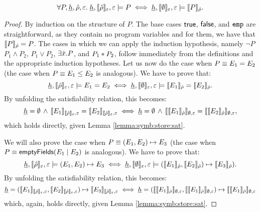
\begin{lemma}\label{lemma:symb:store:sat}
$$
\forall P, \underline{h}, \hat\rho, \varepsilon. \;
\underline{h}, \llbracket \hat\rho \rrbracket_{\varepsilon}, \varepsilon \models P
\iff 
\underline{h}, \llbracket \emptyset \rrbracket_{\varepsilon}, \varepsilon \models \llbracket P \rrbracket_{\hat\rho}.
$$
\end{lemma}
\begin{proof}
By induction on the structure of $P$. The base cases ${\sf true}$, ${\sf false}$, and $\texttt{emp}$ are straightforward, as they contain no program variables and for them, we have that $\llbracket P \rrbracket_{\hat\rho} = P$. The cases in which we can apply the induction hypothesis, namely $\neg P$ $P_1 \wedge P_2$, $P_1 \vee P_2$, $\exists \hat{x}. P$, and $P_1 \mathbin{*} P_2$, follow immediately from the definitions and the appropriate induction hypotheses. Let us now do the case when $P \equiv E_1 = E_2$ (the case when $P \equiv E_1 \leq E_2$ is analogous). We have to prove that:
$$
\underline{h}, \llbracket \hat\rho \rrbracket_{\varepsilon}, \varepsilon \models E_1 = E_2
\iff 
\underline{h}, \llbracket \emptyset \rrbracket_{\varepsilon}, \varepsilon \models \llbracket E_1 \rrbracket_{\hat\rho} = \llbracket E_2 \rrbracket_{\hat\rho}.
$$
By unfolding the satisfiability relation, this becomes:
$$
\underline{h} = \emptyset \, \wedge \, \llbracket E_1 \rrbracket_{\llbracket \hat\rho \rrbracket_{\varepsilon}, \varepsilon} = \llbracket E_2 \rrbracket_{\llbracket \hat\rho \rrbracket_{\varepsilon}, \varepsilon}
\iff 
\underline{h} = \emptyset \, \wedge \, \llbracket \llbracket E_1 \rrbracket_{\hat\rho} \rrbracket_{\emptyset, \varepsilon} = \llbracket \llbracket E_2 \rrbracket_{\hat\rho} \rrbracket_{\emptyset, \varepsilon},
$$
which holds directly, given Lemma \ref{lemma:symb:store:sat}.

We will also prove the case when $P \equiv (E_1,E_2)\mapsto E_3$ (the case when $P \equiv\mathsf{emptyFields}(E_1 \mid E_2)$ is analogous). We have to prove that:
$$
\underline{h}, \llbracket \hat\rho \rrbracket_{\varepsilon}, \varepsilon \models (E_1,E_2) \mapsto E_3
\iff 
\underline{h}, \llbracket \emptyset \rrbracket_{\varepsilon}, \varepsilon \models (\llbracket E_1 \rrbracket_{\hat\rho},\llbracket E_2 \rrbracket_{\hat\rho})\mapsto \llbracket E_3 \rrbracket_{\hat\rho}).
$$
By unfolding the satisfiability relation, this becomes:
$$
\underline{h} = (\llbracket E_1 \rrbracket_{\llbracket \hat\rho \rrbracket_{\varepsilon}, \varepsilon}, \llbracket E_2 \rrbracket_{\llbracket \hat\rho \rrbracket_{\varepsilon}, \varepsilon}) \mapsto \llbracket E_3 \rrbracket_{\llbracket \hat\rho \rrbracket_{\varepsilon}, \varepsilon}
\iff 
\underline{h} = (\llbracket \llbracket E_1 \rrbracket_{\hat\rho} \rrbracket_{\emptyset, \varepsilon}, \llbracket \llbracket E_1 \rrbracket_{\hat\rho} \rrbracket_{\emptyset, \varepsilon}) \mapsto \llbracket \llbracket E_1 \rrbracket_{\hat\rho} \rrbracket_{\emptyset, \varepsilon}
$$
which, again, holds directly, given Lemma \ref{lemma:symb:store:sat}.
\end{proof}


